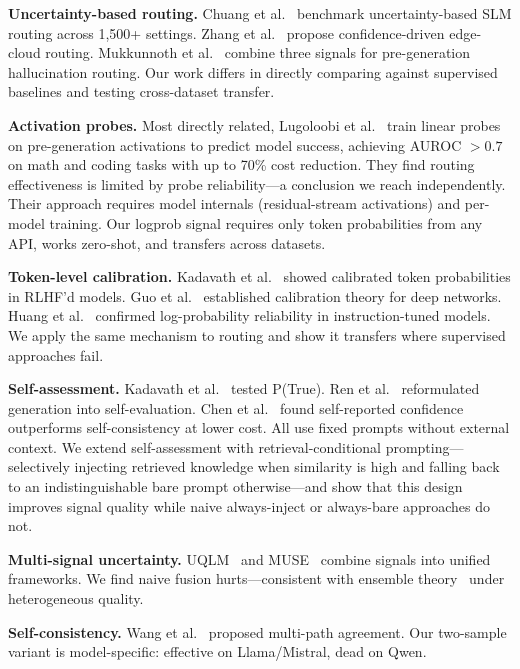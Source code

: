 \documentclass[journal]{IEEEtran}
\begin{document}
\textbf{Uncertainty-based routing.} Chuang et al.~\cite{chuang2025confident} benchmark uncertainty-based SLM routing across 1,500+ settings. Zhang et al.~\cite{zhang2025uncertainty} propose confidence-driven edge-cloud routing. Mukkunnoth et al.~\cite{mukkunnoth2025confidence} combine three signals for pre-generation hallucination routing. Our work differs in directly comparing against supervised baselines and testing cross-dataset transfer.

\textbf{Activation probes.} Most directly related, Lugoloobi et al.~\cite{lugoloobi2026encode} train linear probes on pre-generation activations to predict model success, achieving AUROC ${>}0.7$ on math and coding tasks with up to 70\% cost reduction. They find routing effectiveness is limited by probe reliability---a conclusion we reach independently. Their approach requires model internals (residual-stream activations) and per-model training. Our logprob signal requires only token probabilities from any API, works zero-shot, and transfers across datasets.

\textbf{Token-level calibration.} Kadavath et al.~\cite{kadavath2022language} showed calibrated token probabilities in RLHF'd models. Guo et al.~\cite{guo2017calibration} established calibration theory for deep networks. Huang et al.~\cite{huang2024logprob} confirmed log-probability reliability in instruction-tuned models. We apply the same mechanism to routing and show it transfers where supervised approaches fail.

\textbf{Self-assessment.} Kadavath et al.~\cite{kadavath2022language} tested P(True). Ren et al.~\cite{ren2023selfeval} reformulated generation into self-evaluation. Chen et al.~\cite{chen2024trust} found self-reported confidence outperforms self-consistency at lower cost. All use fixed prompts without external context. We extend self-assessment with retrieval-conditional prompting---selectively injecting retrieved knowledge when similarity is high and falling back to an indistinguishable bare prompt otherwise---and show that this design improves signal quality while naive always-inject or always-bare approaches do not.

\textbf{Multi-signal uncertainty.} UQLM~\cite{lin2025uqlm} and MUSE~\cite{geng2025muse} combine signals into unified frameworks. We find naive fusion hurts---consistent with ensemble theory~\cite{dietterich2000ensemble} under heterogeneous quality.

\textbf{Self-consistency.} Wang et al.~\cite{wang2022selfconsistency} proposed multi-path agreement. Our two-sample variant is model-specific: effective on Llama/Mistral, dead on Qwen.
\end{document}
